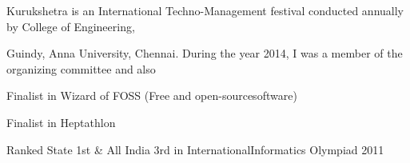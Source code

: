 \begin{cventries}
{\begin{cvitems}
        \item{Kurukshetra is an International Techno-Management festival conducted annually by College of Engineering,}
        \item{Guindy,​ Anna​ University,​ Chennai.​ During​ the​ year​ 2014,​ I was​ a member​ of​ the​ organizing​ committee​ and​ also}
        \item{  Finalist​ in​ Wizard​ of​ FOSS​ (Free​ and​ open-source​ software)}
        \item{  Finalist​ in​ Heptathlon}
        \item{Ranked​ State​ 1st​ \& All​ India​ 3rd​ in​ International​ Informatics​ Olympiad​ 2011}
      \end{cvitems}
        }
\end{cventries}
